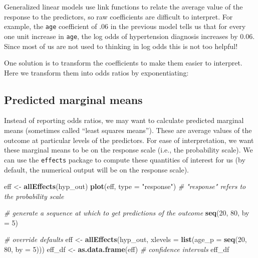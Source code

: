 \documentclass[
]{book}
\newenvironment{Shaded}{\begin{snugshade}}{\end{snugshade}}
\newcommand{\CommentTok}[1]{\textcolor[rgb]{0.56,0.35,0.01}{\textit{#1}}}
\newcommand{\DataTypeTok}[1]{\textcolor[rgb]{0.13,0.29,0.53}{#1}}
\newcommand{\DecValTok}[1]{\textcolor[rgb]{0.00,0.00,0.81}{#1}}
\newcommand{\KeywordTok}[1]{\textcolor[rgb]{0.13,0.29,0.53}{\textbf{#1}}}
\newcommand{\NormalTok}[1]{#1}
\newcommand{\OperatorTok}[1]{\textcolor[rgb]{0.81,0.36,0.00}{\textbf{#1}}}
\newcommand{\StringTok}[1]{\textcolor[rgb]{0.31,0.60,0.02}{#1}}
\begin{document}
Generalized linear models use link functions to relate the average value of the response to the predictors,
so raw coefficients are difficult to interpret. For example, the \texttt{age} coefficient of .06 in the previous
model tells us that for every one unit increase in \texttt{age}, the log odds of hypertension diagnosis increases
by 0.06. Since most of us are not used to thinking in log odds this is not too helpful!

One solution is to transform the coefficients to make them easier to interpret.
Here we transform them into odds ratios by exponentiating:

\begin{Shaded}
\end{Shaded}

\hypertarget{predicted-marginal-means}{%
\subsection{Predicted marginal means}\label{predicted-marginal-means}}

Instead of reporting odds ratios, we may want to calculate predicted marginal means (sometimes called ``least squares means'').
These are average values of the outcome at particular levels of the predictors. For ease of interpretation, we want these
marginal means to be on the response scale (i.e., the probability scale). We can use the \texttt{effects} package to compute
these quantities of interest for us (by default, the numerical output will be on the response scale).

\begin{Shaded}
\begin{Highlighting}[]
\NormalTok{  eff <-}\StringTok{ }\KeywordTok{allEffects}\NormalTok{(hyp_out)}
  \KeywordTok{plot}\NormalTok{(eff, }\DataTypeTok{type =} \StringTok{"response"}\NormalTok{) }\CommentTok{# "response" refers to the probability scale}

  \CommentTok{# generate a sequence at which to get predictions of the outcome}
  \KeywordTok{seq}\NormalTok{(}\DecValTok{20}\NormalTok{, }\DecValTok{80}\NormalTok{, }\DataTypeTok{by =} \DecValTok{5}\NormalTok{)}

  \CommentTok{# override defaults}
\NormalTok{  eff <-}\StringTok{ }\KeywordTok{allEffects}\NormalTok{(hyp_out, }\DataTypeTok{xlevels =} \KeywordTok{list}\NormalTok{(}\DataTypeTok{age_p =} \KeywordTok{seq}\NormalTok{(}\DecValTok{20}\NormalTok{, }\DecValTok{80}\NormalTok{, }\DataTypeTok{by =} \DecValTok{5}\NormalTok{)))}
\NormalTok{  eff_df <-}\StringTok{ }\KeywordTok{as.data.frame}\NormalTok{(eff) }\CommentTok{# confidence intervals}
\NormalTok{  eff_df}
\end{Highlighting}
\end{Shaded}
\end{document}
